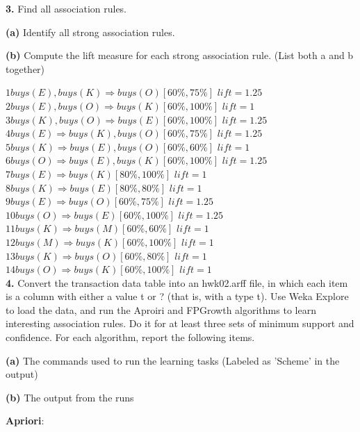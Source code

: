 \documentclass[12pt]{elsart}
\begin{document}
{\bf 3.} Find all association rules.

{\bf (a)} Identify all strong association rules.

{\bf (b)} Compute the lift measure for each strong association rule. (List both a and b together)

$1 buys(E), buys(K) \Rightarrow buys(O)[60\%, 75\%]$ $lift=1.25$ \\
$2 buys(E), buys(O) \Rightarrow buys(K)[60\%, 100\%]$ $lift=1$ \\
$3 buys(K), buys(O) \Rightarrow buys(E)[60\%, 100\%]$ $lift=1.25$ \\
$4 buys(E) \Rightarrow buys(K), buys(O)[60\%, 75\%]$ $lift=1.25$ \\
$5 buys(K) \Rightarrow buys(E), buys(O)[60\%, 60\%]$ $lift=1$ \\
$6 buys(O) \Rightarrow buys(E), buys(K)[60\%, 100\%]$ $lift=1.25$ \\
$7 buys(E) \Rightarrow buys(K)[80\%, 100\%]$ $lift=1$ \\
$8 buys(K) \Rightarrow buys(E)[80\%, 80\%]$ $lift=1$ \\
$9 buys(E) \Rightarrow buys(O)[60\%, 75\%]$ $lift=1.25$ \\
$10 buys(O) \Rightarrow buys(E)[60\%, 100\%]$ $lift=1.25$ \\
$11 buys(K) \Rightarrow buys(M)[60\%, 60\%]$ $lift=1$ \\
$12 buys(M) \Rightarrow buys(K)[60\%, 100\%]$ $lift=1$ \\
$13 buys(K) \Rightarrow buys(O)[60\%, 80\%]$ $lift=1$ \\
$14 buys(O) \Rightarrow buys(K)[60\%, 100\%]$ $lift=1$ \\

{\bf 4.} Convert the transaction data table into an hwk02.arff file, in which each item is a column
with either a value t or ? (that is, with a type {t}). Use Weka Explore to load the data, and run the Aproiri and FPGrowth algorithms to learn interesting association rules. Do it for at least three sets of minimum support and confidence. For each algorithm, report the following items.

{\bf (a)} The commands used to run the learning tasks (Labeled as 'Scheme' in the output)

{\bf (b)} The output from the runs

{\bf Apriori}:
\end{document}
